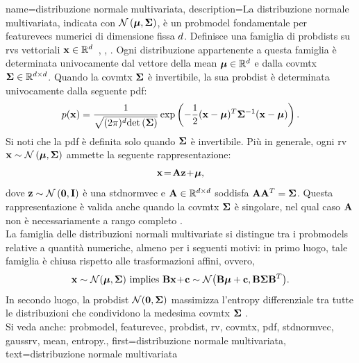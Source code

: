 {name={distribuzione normale multivariata}, 
	description={La distribuzione normale multivariata, 
 		indicata con $\mathcal{N}\left({\bm \mu},{\bf \Sigma}\right)$, è un \gls{probmodel} fondamentale
 		per \glspl{featurevec} numerici di dimensione fissa $d$. 
 		Definisce una famiglia di \glspl{probdist} su \glspl{rv} vettoriali
 		${\bf x} \in \mathbb{R}^{d}$~\cite{BertsekasProb}, \cite{GrayProbBook}, \cite{Lapidoth09}. 
 		Ogni distribuzione appartenente a questa famiglia è determinata univocamente dal vettore della \gls{mean}  
 		${\bm \mu} \in \mathbb{R}^{d}$ e dalla \gls{covmtx} ${\bf \Sigma} \in \mathbb{R}^{d \times d}$. 
 		Quando la \gls{covmtx} ${\bf \Sigma}$ è invertibile, la sua \gls{probdist} è 
 		determinata univocamente dalla seguente \gls{pdf}:
 		\[
 		p({\bf x}) = 
 		\frac{1}{\sqrt{(2\pi)^{d} {\rm det}\left( {\bf \Sigma} \right)}} 
 		\exp\left( -\frac{1}{2} 
 		({\bf x} - {\bm \mu})^T {\bf \Sigma}^{-1} 
 		({\bf x} - {\bm \mu}) \right).
 		\]
 		Si noti che la \gls{pdf} è definita solo quando ${\bf \Sigma}$ è invertibile.
     		Più in generale, ogni \gls{rv} ${\bf x} \sim \mathcal{N}\left({\bm \mu},{\bf \Sigma}\right)$ 
     		ammette la seguente rappresentazione:
		\[{\bf x} \!=\! {\bf A} {\bf z} \!+\!{\bm \mu},
		\]
		dove ${\bf z} \sim \mathcal{N}\left(\mathbf{0},\mathbf{I}\right)$ è una \gls{stdnormvec} 
		e ${\bf A} \in \mathbb{R}^{d \times d}$ soddisfa ${\bf A} {\bf A}^T = {\bf \Sigma}$. 
		Questa rappresentazione è valida anche quando la \gls{covmtx} ${\bf \Sigma}$ è singolare, 
		nel qual caso ${\bf A}$ non è necessariamente a rango completo \cite[Ch. 23]{Lapidoth2017}.\\ 
		La famiglia delle distribuzioni normali multivariate si distingue tra i \glspl{probmodel} relative a quantità numeriche, 
		almeno per i seguenti motivi: in primo luogo, tale famiglia è chiusa rispetto alle trasformazioni affini, ovvero, 
		\[ 
		{\bf x} \sim \mathcal{N}({\bm \mu},{\bf \Sigma}) \mbox{ implies } 
		{\bf B}{\bf x}\!+\!{\bf c} \sim \mathcal{N}\big( {\bf B}{\bm \mu}+{\bf c},{\bf B} {\bf \Sigma} {\bf B}^{T} \big). 
		\]
		In secondo luogo, la \gls{probdist} $\mathcal{N}(\mathbf{0},{\bf \Sigma})$ massimizza l'\gls{entropy} 
		differenziale tra tutte le distribuzioni che condividono la medesima \gls{covmtx} ${\bf \Sigma}$ \cite{coverthomas}. 
		\\ 
		Si veda anche: \gls{probmodel}, \gls{featurevec}, \gls{probdist}, \gls{rv}, \gls{covmtx}, \gls{pdf}, \gls{stdnormvec}, 
		\gls{gaussrv}, \gls{mean}, \gls{entropy}.}, 
	first={distribuzione normale multivariata},
	text={distribuzione normale multivariata}
}

